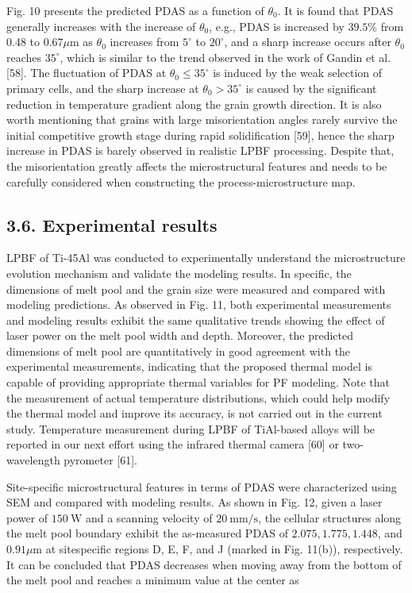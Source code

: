 \documentclass[10pt]{article}
\begin{document}
Fig. 10 presents the predicted PDAS as a function of $\theta_{0}$. It is found that PDAS generally increases with the increase of $\theta_{0}$, e.g., PDAS is increased by $39.5 \%$ from 0.48 to $0.67 \mu \mathrm{m}$ as $\theta_{0}$ increases from $5^{\circ}$ to $20^{\circ}$, and a sharp increase occurs after $\theta_{0}$ reaches $35^{\circ}$, which is similar to the trend observed in the work of Gandin et al. [58]. The fluctuation of PDAS at $\theta_{0} \leq 35^{\circ}$ is induced by the weak selection of primary cells, and the sharp increase at $\theta_{0}>35^{\circ}$ is caused by the significant reduction in temperature gradient along the grain growth direction. It is also worth mentioning that grains with large misorientation angles rarely survive the initial competitive growth stage during rapid solidification [59], hence the sharp increase in PDAS is barely observed in realistic LPBF processing. Despite that, the misorientation greatly affects the microstructural features and needs to be carefully considered when constructing the process-microstructure map.

\subsection*{3.6. Experimental results}
LPBF of Ti-45Al was conducted to experimentally understand the microstructure evolution mechanism and validate the modeling results. In specific, the dimensions of melt pool and the grain size were measured and compared with modeling predictions. As observed in Fig. 11, both experimental measurements and modeling results exhibit the same qualitative trends showing the effect of laser power on the melt pool width and depth. Moreover, the predicted dimensions of melt pool are quantitatively in good agreement with the experimental measurements, indicating that the proposed thermal model is capable of providing appropriate thermal variables for PF modeling. Note that the measurement of actual temperature distributions, which could help modify the thermal model and improve its accuracy, is not carried out in the current study. Temperature measurement during LPBF of TiAl-based alloys will be reported in our next effort using the infrared thermal camera [60] or two-wavelength pyrometer [61].

Site-specific microstructural features in terms of PDAS were characterized using SEM and compared with modeling results. As shown in Fig. 12, given a laser power of $150 \mathrm{~W}$ and a scanning velocity of $20 \mathrm{~mm} / \mathrm{s}$, the cellular structures along the melt pool boundary exhibit the as-measured PDAS of $2.075,1.775,1.448$, and $0.91 \mu \mathrm{m}$ at sitespecific regions D, E, F, and J (marked in Fig. 11(b)), respectively. It can be concluded that PDAS decreases when moving away from the bottom of the melt pool and reaches a minimum value at the center as
\end{document}
